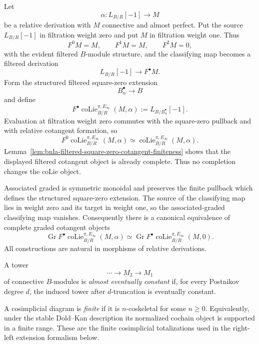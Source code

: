 \begin{construction}
\label{con:bnla-colie-anchor-filtration}
Let
\[
    \alpha:L_{B/R}[-1]\longrightarrow M
\]
be a relative derivation with $M$ connective and almost perfect.  Put the
source $L_{B/R}[-1]$ in filtration weight zero and put $M$ in filtration
weight one.  Thus
\[
    F^0M=M,
    \qquad
    F^1M=M,
    \qquad
    F^2M=0,
\]
with the evident filtered $B$-module structure, and the classifying map becomes
a filtered derivation
\[
    L_{B/R}[-1]\longrightarrow F^\bullet M.
\]
Form the structured filtered square-zero extension
\[
    B^\bullet_\alpha\longrightarrow B
\]
and define
\[
\boxed{
    F^\bullet
    \operatorname{coLie}^{\pi,E_\infty}_{B/R}(M,\alpha)
    :=
    L_{B/B^\bullet_\alpha}[-1].}
\]
Evaluation at filtration weight zero commutes with the square-zero pullback and
with relative cotangent formation, so
\[
\boxed{
    F^0
    \operatorname{coLie}^{\pi,E_\infty}_{B/R}(M,\alpha)
    \simeq
    \operatorname{coLie}^{\pi,E_\infty}_{B/R}(M,\alpha).}
\]
Lemma~\ref{lem:bnla-filtered-square-zero-cotangent-finiteness} shows that the
displayed filtered cotangent object is already complete.  Thus no completion
changes the coLie object.

Associated graded is symmetric monoidal and preserves the finite pullback
which defines the structured square-zero extension.  The source of the
classifying map lies in weight zero and its target in weight one, so the
associated-graded classifying map vanishes.  Consequently there is a canonical
equivalence of complete graded cotangent objects
\[
\boxed{
    \operatorname{Gr}
    F^\bullet\operatorname{coLie}^{\pi,E_\infty}_{B/R}(M,\alpha)
    \simeq
    \operatorname{Gr}
    F^\bullet\operatorname{coLie}^{\pi,E_\infty}_{B/R}(M,0).}
\]
All constructions are natural in morphisms of relative derivations.
\end{construction}

\begin{definition}
\label{def:bnla-almost-eventually-constant}
A tower
\[
    \cdots\longrightarrow M_2\longrightarrow M_1
\]
of connective $B$-modules is \emph{almost eventually constant} if, for every
Postnikov degree $d$, the induced tower after $d$-truncation is eventually
constant.
\end{definition}

\begin{definition}
\label{def:bnla-finite-cosimplicial}
A cosimplicial diagram is \emph{finite} if it is $n$-coskeletal for some
$n\geq0$.  Equivalently, under the stable Dold--Kan description its normalized
cochain object is supported in a finite range.  These are the finite
cosimplicial totalizations used in the right-left extension formalism below.
\end{definition}

